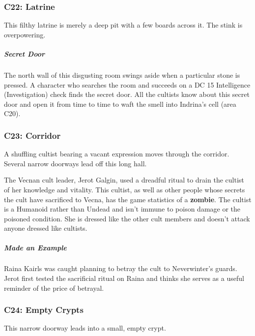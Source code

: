 \documentclass[10pt,a4paper,twoside,bg=print,twocolumn,openany,nodeprecatedcode]{dndbook}
\begin{document}
\subsubsection{C22: Latrine}
\begin{DndReadAloud}{}
This filthy latrine is merely a deep pit with a few boards across it. The stink is overpowering.

\end{DndReadAloud}

\subparagraph{Secret Door}
The north wall of this disgusting room swings aside when a particular stone is pressed. A character who searches the room and succeeds on a DC 15 Intelligence (Investigation) check finds the secret door. All the cultists know about this secret door and open it from time to time to waft the smell into Indrina's cell (area C20).

\subsubsection{C23: Corridor}
\begin{DndReadAloud}{}
A shuffling cultist bearing a vacant expression moves through the corridor. Several narrow doorways lead off this long hall.

\end{DndReadAloud}

The Vecnan cult leader, Jerot Galgin, used a dreadful ritual to drain the cultist of her knowledge and vitality. This cultist, as well as other people whose secrets the cult have sacrificed to Vecna, has the game statistics of a \textbf{zombie}. The cultist is a Humanoid rather than Undead and isn't immune to poison damage or the poisoned condition. She is dressed like the other cult members and doesn't attack anyone dressed like cultists.

\subparagraph{Made an Example}
Raina Kairls was caught planning to betray the cult to Neverwinter's guards. Jerot first tested the sacrificial ritual on Raina and thinks she serves as a useful reminder of the price of betrayal.

\subsubsection{C24: Empty Crypts}
\begin{DndReadAloud}{}
This narrow doorway leads into a small, empty crypt.

\end{DndReadAloud}
\end{document}

